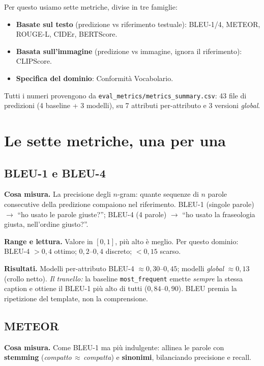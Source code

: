 \documentclass[11pt,a4paper]{article}
\begin{document}
Per questo usiamo sette metriche, divise in tre famiglie:
\begin{itemize}
\item \textbf{Basate sul testo} (predizione vs riferimento testuale):
BLEU-1/4, METEOR, ROUGE-L, CIDEr, BERTScore.
\item \textbf{Basata sull'immagine} (predizione vs immagine, ignora il
riferimento): CLIPScore.
\item \textbf{Specifica del dominio}: Conformità Vocabolario.
\end{itemize}

Tutti i numeri provengono da \texttt{eval\_metrics/metrics\_summary.csv}: 43 file
di predizioni (4 baseline + 3 modelli), su 7 attributi per-attributo e 3 versioni
\emph{global}.

\section{Le sette metriche, una per una}

\subsection{BLEU-1 e BLEU-4}
\textbf{Cosa misura.} La precisione degli $n$-gram: quante sequenze di $n$ parole
consecutive della predizione compaiono nel riferimento. BLEU-1 (singole parole)
$\to$ ``ho usato le parole giuste?''; BLEU-4 (4 parole) $\to$ ``ho usato la
fraseologia giusta, nell'ordine giusto?''.

\textbf{Range e lettura.} Valore in $[0,1]$, più alto è meglio. Per questo
dominio: BLEU-4 $>0{,}4$ ottimo; $0{,}2$--$0{,}4$ discreto; $<0{,}15$ scarso.

\textbf{Risultati.} Modelli per-attributo BLEU-4 $\approx 0{,}30$--$0{,}45$;
modelli \emph{global} $\approx 0{,}13$ (crollo netto). \emph{Il tranello:} la
baseline \texttt{most\_frequent} emette \emph{sempre} la stessa caption e ottiene
il BLEU-1 più alto di tutti ($0{,}84$--$0{,}90$). BLEU premia la ripetizione del
template, non la comprensione.

\subsection{METEOR}
\textbf{Cosa misura.} Come BLEU-1 ma più indulgente: allinea le parole con
\textbf{stemming} (\textit{compatto}\,$\approx$\,\textit{compatta}) e
\textbf{sinonimi}, bilanciando precisione e recall.
\end{document}
